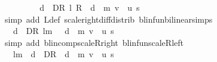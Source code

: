 \begin{isabellebody}
\ \ \ \ \isamarkupfalse%
\ \isamarkupfalse%
\ {\isachardoublequoteopen}{\isasymdots}\ {\isacharequal}{\kern0pt}\ {\isacharparenleft}{\kern0pt}{\isasymSqunion}d\ {\isasymin}\ D\isactrlsub R{\isachardot}{\kern0pt}\ {\isacharparenleft}{\kern0pt}{\isacharparenleft}{\kern0pt}l\ {\isacharasterisk}{\kern0pt}\isactrlsub R\ {\isasymP}\ d{\isacharparenright}{\kern0pt}\ {\isacharcircum}{\kern0pt}{\isacharcircum}{\kern0pt}\ m{\isacharparenright}{\kern0pt}\ {\isacharparenleft}{\kern0pt}v\ {\isacharminus}{\kern0pt}\ u{\isacharparenright}{\kern0pt}\ s{\isacharparenright}{\kern0pt}{\isachardoublequoteclose}\isanewline
\ \ \ \ \ \ \isamarkupfalse%
\ {\isacharparenleft}{\kern0pt}simp\ add{\isacharcolon}{\kern0pt}\ L{\isacharunderscore}{\kern0pt}def\ scale{\isacharunderscore}{\kern0pt}right{\isacharunderscore}{\kern0pt}diff{\isacharunderscore}{\kern0pt}distrib\ blinfun{\isachardot}{\kern0pt}bilinear{\isacharunderscore}{\kern0pt}simps{\isacharparenright}{\kern0pt}\isanewline
\ \ \ \ \isamarkupfalse%
\ \isamarkupfalse%
\ {\isachardoublequoteopen}{\isasymdots}\ {\isacharequal}{\kern0pt}\ {\isacharparenleft}{\kern0pt}{\isasymSqunion}d\ {\isasymin}\ D\isactrlsub R{\isachardot}{\kern0pt}\ l{\isacharcircum}{\kern0pt}m\ {\isacharasterisk}{\kern0pt}\ {\isacharparenleft}{\kern0pt}{\isacharparenleft}{\kern0pt}{\isasymP}\ d\ {\isacharcircum}{\kern0pt}{\isacharcircum}{\kern0pt}\ m{\isacharparenright}{\kern0pt}\ {\isacharparenleft}{\kern0pt}v\ {\isacharminus}{\kern0pt}\ u{\isacharparenright}{\kern0pt}\ s{\isacharparenright}{\kern0pt}{\isacharparenright}{\kern0pt}{\isachardoublequoteclose}\isanewline
\ \ \ \ \ \ \isamarkupfalse%
\ {\isacharparenleft}{\kern0pt}simp\ add{\isacharcolon}{\kern0pt}\ blincomp{\isacharunderscore}{\kern0pt}scaleR{\isacharunderscore}{\kern0pt}right\ blinfun{\isachardot}{\kern0pt}scaleR{\isacharunderscore}{\kern0pt}left{\isacharparenright}{\kern0pt}\isanewline
\ \ \ \ \isamarkupfalse%
\ \isamarkupfalse%
\ {\isachardoublequoteopen}{\isasymdots}\ {\isacharequal}{\kern0pt}\ l{\isacharcircum}{\kern0pt}m\ {\isacharasterisk}{\kern0pt}\ {\isacharparenleft}{\kern0pt}{\isasymSqunion}d\ {\isasymin}\ D\isactrlsub R{\isachardot}{\kern0pt}\ {\isacharparenleft}{\kern0pt}{\isacharparenleft}{\kern0pt}{\isasymP}\ d\ {\isacharcircum}{\kern0pt}{\isacharcircum}{\kern0pt}\ m{\isacharparenright}{\kern0pt}\ {\isacharparenleft}{\kern0pt}v\ {\isacharminus}{\kern0pt}\ u{\isacharparenright}{\kern0pt}\ s{\isacharparenright}{\kern0pt}{\isacharparenright}{\kern0pt}{\isachardoublequoteclose}\ \isanewline

\end{isabellebody}
